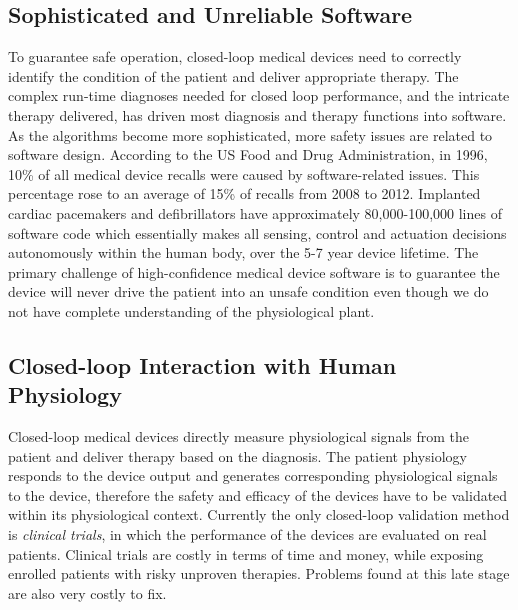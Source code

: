 \documentclass[a4paper]{article}
\begin{document}
\subsection{Sophisticated and Unreliable Software}
To guarantee safe operation, closed-loop medical devices need to correctly identify the condition of the patient and deliver appropriate therapy.
The complex run-time diagnoses needed for closed loop performance, and the intricate therapy delivered, has driven most diagnosis and therapy functions into software.
As the algorithms become more sophisticated, more safety issues are related to software design. 
According to the US Food and Drug Administration, in 1996, 10\% of all medical device recalls were caused by software-related issues. 
This percentage rose to an average of 15\% of recalls from 2008 to 2012. 
Implanted cardiac pacemakers and defibrillators have approximately 80,000-100,000 lines of software code which essentially makes all sensing, control and actuation decisions autonomously within the human body, over the 5-7 year device lifetime. 
The primary challenge of high-confidence medical device software is to guarantee the device will never drive the patient into an unsafe condition even though we do not have complete understanding of the physiological plant.  
\subsection{Closed-loop Interaction with Human Physiology}
Closed-loop medical devices directly measure physiological signals from the patient and deliver therapy based on the diagnosis.
The patient physiology responds to the device output and generates corresponding physiological signals to the device, therefore the safety and efficacy of the devices have to be validated within its physiological context.
Currently the only closed-loop validation method is \emph{clinical trials}, in which the performance of the devices are evaluated on real patients.
Clinical trials are costly in terms of time and money, while exposing enrolled patients with risky unproven therapies.
Problems found at this late stage are also very costly to fix.
\end{document}
